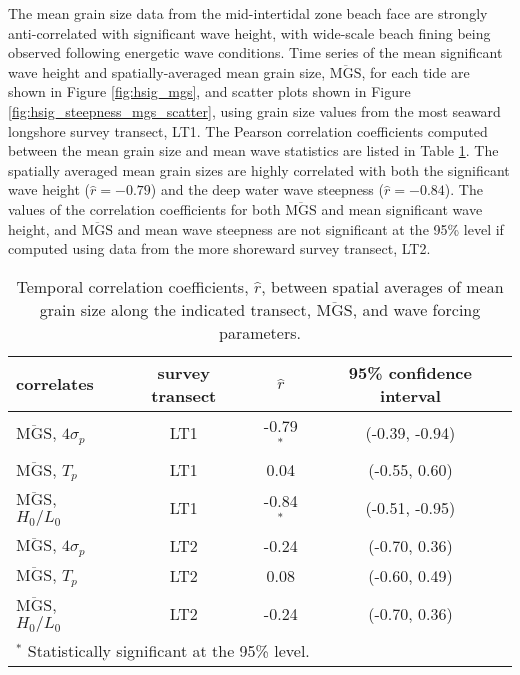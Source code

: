\documentclass[jmse,article,submit,pdftex,moreauthors]{Definitions/mdpi}
\begin{document}
The mean grain size data from the mid-intertidal zone beach face are strongly anti-correlated with significant wave height, with wide-scale beach fining being observed following energetic wave conditions. Time series of the mean significant wave height and spatially-averaged mean grain size, $\overline{\mathrm{MGS}}$, for each tide are shown in Figure \ref{fig:hsig_mgs}, and scatter plots shown in Figure \ref{fig:hsig_steepness_mgs_scatter}, using grain size values from the most seaward longshore survey transect, LT1. The Pearson correlation coefficients computed between the mean grain size and mean wave statistics are listed in Table \ref{table:temporal_correlations}. The spatially averaged mean grain sizes are highly correlated with both the significant wave height ($\hat{r}=-0.79$) and the deep water wave steepness ($\hat{r}=-0.84$). The values of the correlation coefficients for both $\overline{\mathrm{MGS}}$ and mean significant wave height, and $\overline{\mathrm{MGS}}$ and mean wave steepness are not significant at the 95\% level if computed using data from the more shoreward survey transect, LT2.

\begin{table}[tbp!]
	\caption[Temporal correlation coefficients: mean grain size and wave parameters]{Temporal correlation coefficients, $\hat{r}$, between spatial averages of mean grain size along the indicated transect, $\overline{\mathrm{MGS}}$, and wave forcing parameters.\label{table:temporal_correlations}} 
	\centering
	\begin{tabular}{lccc}
		\hline
		correlates & survey transect & $\hat{r}$ & 95\% confidence interval\\
		\hline
		$\overline{\mathrm{MGS}}$, $4\sigma_p$ & LT1 & -0.79$^{*}$ & (-0.39, -0.94)\\
		$\overline{\mathrm{MGS}}$, $T_p$ & LT1 & 0.04 & (-0.55, 0.60)\\
		$\overline{\mathrm{MGS}}$, $H_0/L_0$ & LT1 & -0.84$^{*}$ & (-0.51, -0.95)\\
		$\overline{\mathrm{MGS}}$, $4\sigma_p$ & LT2 & -0.24 & (-0.70, 0.36)\\
		$\overline{\mathrm{MGS}}$, $T_p$ & LT2 & 0.08 & (-0.60, 0.49)\\
		$\overline{\mathrm{MGS}}$, $H_0/L_0$ & LT2 & -0.24 & (-0.70, 0.36)\\
		\hline
		\multicolumn{4}{l}{$^{*}$ Statistically significant at the 95\% level.}
	\end{tabular}
\end{table}
\end{document}
